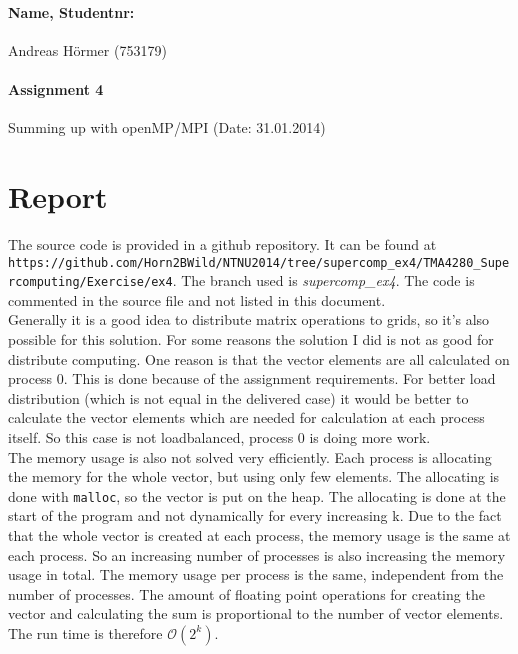 \documentclass{article}
\begin{document}
\paragraph{Name, Studentnr: }Andreas H\"ormer (753179)
\paragraph{Assignment 4}Summing up with openMP/MPI (Date: 31.01.2014)

	\section{Report}
		The source code is provided in a github repository. It can be found at\\
		\small{\texttt{https://github.com/Horn2BWild/NTNU2014/tree/supercomp\_ex4/TMA4280\_Supercomputing/Exercise/ex4}. The branch used is \textit{supercomp\_ex4}}. The code is commented in the source file and not listed in this document.\\
		Generally it is a good idea to distribute matrix operations to grids, so it's also possible for this solution. For some reasons the solution I did is not as good for distribute computing. One reason is that the vector elements are all calculated on process 0. This is done because of the assignment requirements. For better load distribution (which is not equal in the delivered case) it would be better to calculate the vector elements which are needed for calculation at each process itself. So this case is not loadbalanced, process 0 is doing more work.\\
The memory usage is also not solved very efficiently. Each process is allocating the memory for the whole vector, but using only few elements. The allocating is done with \texttt{malloc}, so the vector is put on the heap. The allocating is done at the start of the program and not dynamically for every increasing k. Due to the fact that the whole vector is created at each process, the memory usage is the same at each process. So an increasing number of processes is also increasing the memory usage in total. The memory usage per process is the same, independent from the number of processes. 
The amount of floating point operations for creating the vector and calculating the sum is proportional to the number of vector elements. The run time is therefore $\mathcal{O}(2^k)$.\\
\end{document}
